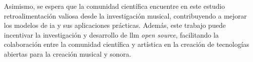 Asimismo, se espera que la comunidad científica encuentre en este estudio retroalimentación valiosa desde la investigación musical, contribuyendo a mejorar los modelos de \gls{ia} y sus aplicaciones prácticas. Además, este trabajo puede incentivar la investigación y desarrollo de \gls{llm} \textit{open source}, facilitando la colaboración entre la comunidad científica y artística en la creación de tecnologías abiertas para la creación musical y sonora.